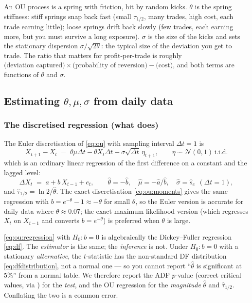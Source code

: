 \begin{intuition}
An OU process is a spring with friction, hit by random kicks. $\theta$ is the spring
stiffness: stiff springs snap back fast (small $\tau_{1/2}$, many trades, high cost,
each trade earning little); loose springs drift back slowly (few trades, each earning
more, but you must survive a long exposure). $\sigma$ is the size of the kicks and sets
the stationary dispersion $\sigma/\sqrt{2\theta}$: the typical size of the deviation you
get to trade. The ratio that matters for profit-per-trade is roughly
$\text{(deviation captured)} \times \text{(probability of reversion)} - \text{(cost)}$,
and both terms are functions of $\theta$ and $\sigma$.
\end{intuition}

\subsection{Estimating $\theta,\mu,\sigma$ from daily data}
\label{sec:ou:estimation}

\subsubsection{The discretised regression (what  does)}

The Euler discretisation of \eqref{eq:ou} with sampling interval $\Delta t=1$ is
\[
  X_{t+1}-X_t \;=\; \theta\mu\Delta t - \theta X_t\Delta t + \sigma\sqrt{\Delta t}\,\eta_{t+1},
  \qquad \eta\sim\mathcal N(0,1)\ \text{i.i.d.}
\]
which is an ordinary linear regression of the first difference on a constant and the
lagged level:
\begin{equation}
  \Delta X_t \;=\; a + b\,X_{t-1} + e_t,
  \qquad
  \hat\theta = -\hat b,\quad
  \hat\mu = -\hat a/\hat b,\quad
  \hat\sigma = \hat s_e\ \ (\Delta t=1),
  \label{eq:ou:regression}
\end{equation}
and $\hat\tau_{1/2}=\ln 2/\hat\theta$. The exact discretisation
\eqref{eq:ou:moments} gives the same regression with $b=e^{-\theta}-1\approx-\theta$ for
small $\theta$, so the Euler version is accurate for daily data where
$\theta\approx0.07$; the exact maximum-likelihood version (which regresses $X_t$ on
$X_{t-1}$ and converts $b=e^{-\theta}$) is preferred when $\theta$ is large.

\begin{remark}
\eqref{eq:ou:regression} with $H_0:b=0$ is algebraically the Dickey--Fuller regression
\eqref{eq:df}. The \emph{estimator} is the same; the \emph{inference} is not. Under
$H_0:b=0$ with a stationary \emph{alternative}, the $t$-statistic has the non-standard
DF distribution \eqref{eq:dfdistribution}, not a normal one --- so you cannot report
``$\hat\theta$ is significant at 5\%'' from a normal table. We therefore report the ADF
$p$-value (correct critical values, via ) for the \emph{test}, and the
OU regression for the \emph{magnitude} $\hat\theta$ and $\hat\tau_{1/2}$. Conflating the
two is a common error.
\end{remark}

